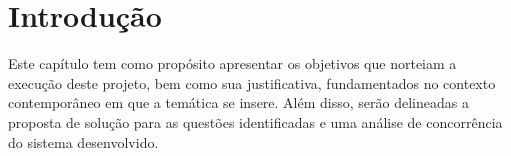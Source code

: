 \chapter[Introdução]{Introdução}

Este capítulo tem como propósito apresentar os objetivos que norteiam a execução deste projeto, bem como sua justificativa, fundamentados no contexto contemporâneo em que a temática se insere. Além disso, serão delineadas a proposta de solução para as questões identificadas e uma análise de concorrência do sistema desenvolvido.







